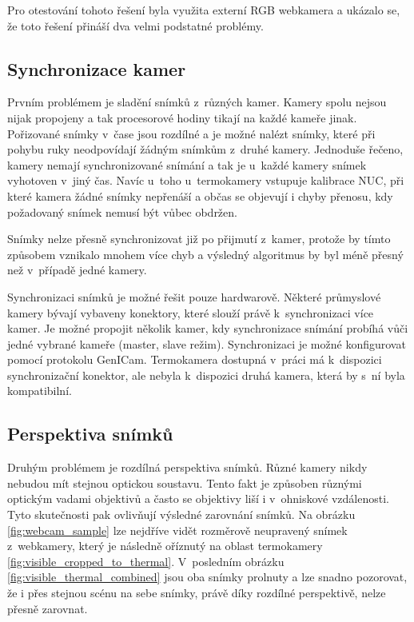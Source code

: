Pro otestování tohoto řešení byla využita externí RGB webkamera a ukázalo se, že toto řešení přináší dva velmi podstatné problémy.

    \subsection{Synchronizace kamer}
    Prvním problémem je sladění snímků z~různých kamer. Kamery spolu nejsou nijak propojeny a tak procesorové hodiny tikají na každé kameře jinak. Pořizované snímky v~čase jsou rozdílné a je možné nalézt snímky, které při pohybu ruky neodpovídají žádným snímkům z~druhé kamery. Jednoduše řečeno, kamery nemají synchronizované snímání a tak je u~každé kamery snímek vyhotoven v~jiný čas. Navíc u~toho u~termokamery vstupuje kalibrace NUC, při které kamera žádné snímky nepřenáší a občas se objevují i chyby přenosu, kdy požadovaný snímek nemusí být vůbec obdržen. 

    Snímky nelze přesně synchronizovat již po přijmutí z~kamer, protože by tímto způsobem vznikalo mnohem více chyb a výsledný algoritmus by byl méně přesný než v~případě jedné kamery.

    Synchronizaci snímků je možné řešit pouze hardwarově. Některé průmyslové kamery bývají vybaveny konektory, které slouží právě k~synchronizaci více kamer. Je možné propojit několik kamer, kdy synchronizace snímání probíhá vůči jedné vybrané kameře (master, slave režim). Synchronizaci je možné konfigurovat pomocí protokolu GenICam. Termokamera dostupná v~práci má k~dispozici synchronizační konektor, ale nebyla k~dispozici druhá kamera, která by s~ní byla kompatibilní.

	\subsection{Perspektiva snímků}
    Druhým problémem je rozdílná perspektiva snímků. Různé kamery nikdy nebudou mít stejnou optickou soustavu. Tento fakt je způsoben různými optickým vadami objektivů a často se objektivy liší i v~ohniskové vzdálenosti. Tyto skutečnosti pak ovlivňují výsledné zarovnání snímků. Na obrázku \ref{fig:webcam_sample} lze nejdříve vidět rozměrově neupravený snímek z~webkamery, který je následně oříznutý na oblast termokamery \ref{fig:visible_cropped_to_thermal}. V~posledním obrázku \ref{fig:visible_thermal_combined} jsou oba snímky prolnuty a lze snadno pozorovat, že i přes stejnou scénu na sebe snímky, právě díky rozdílné perspektivě, nelze přesně zarovnat.

